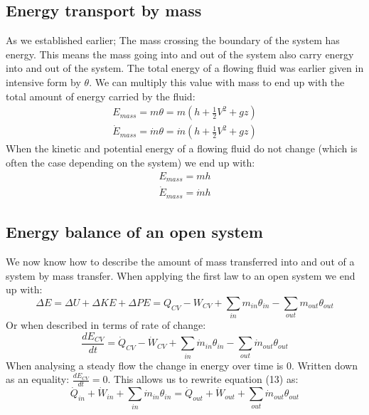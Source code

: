 \documentclass[11pt, a4paper]{article}
\begin{document}
\subsection{Energy transport by mass}
As we established earlier; The mass crossing the boundary of the system has energy. This means the mass going into and out of the system also carry energy into and out of the system. The total energy of a flowing fluid was earlier given in intensive form by $\theta$. We can multiply this value with mass to end up with the total amount of energy carried by the fluid:
\begin{gather}
  E_{mass} = m \theta = m \left( h + \frac{1}{2}V^2 + gz \right)\\
  \dot{E}_{mass} = \dot{m} \theta = \dot{m} \left( h + \frac{1}{2}V^2 + gz \right)
\end{gather}
When the kinetic and potential energy of a flowing fluid do not change (which is often the case depending on the system) we end up with:
\begin{gather}
  E_{mass} = mh\\
  \dot{E}_{mass} = \dot{m}h
\end{gather}


\subsection{Energy balance of an open system}
We now know how to describe the amount of mass transferred into and out of a system by mass transfer. When applying the first law to an open system we end up with:
\begin{equation}
  \Delta E = \Delta U + \Delta KE + \Delta PE = Q_{CV} - W_{CV} + \sum_{in} m_{in}\theta_{in} - \sum_{out} m_{out} \theta_{out} 
\end{equation}
Or when described in terms of rate of change:
\begin{equation}
  \frac{dE_{CV}}{dt} = \dot{Q}_{CV} - \dot{W}_{CV} + \sum_{in} \dot{m}_{in}\theta_{in} - \sum_{out} \dot{m}_{out} \theta_{out}
\end{equation}
When analysing a steady flow the change in energy over time is $0$. Written down as an equality: $\frac{dE_{CV}}{dt} = 0$. This allows us to rewrite equation (13) as:
\begin{equation}
  \dot{Q}_{in} + \dot{W}_{in} + \sum_{in} \dot{m}_{in} \theta_{in}  = \dot{Q}_{out} + \dot{W}_{out} + \sum_{out} \dot{m}_{out} \theta_{out}
\end{equation}
\end{document}
